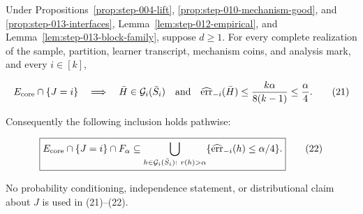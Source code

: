 \begin{proposition}\label{prop:step-013-pathwise}
Under Propositions~\ref{prop:step-004-lift},
\ref{prop:step-010-mechanism-good}, and
\ref{prop:step-013-interfaces}, Lemma~\ref{lem:step-012-empirical}, and
Lemma~\ref{lem:step-013-block-family}, suppose \(d\geq1\). For every
complete realization of the sample, partition, learner transcript,
mechanism coins, and analysis mark, and every \(i\in[k]\),

\[
 E_{\rm core}\cap\{J=i\}
 \quad\Longrightarrow\quad
 \bar H\in\mathcal G_i(\bar S_i)
 \quad\text{and}\quad
 \widehat{\operatorname{err}}_{-i}(\bar H)
 \leq\frac{k\alpha}{8(k-1)}\leq\frac\alpha4.
 \tag{21}
\]

Consequently the following inclusion holds pathwise:

\[
 \boxed{
 E_{\rm core}\cap\{J=i\}\cap F_\alpha
 \subseteq
 \bigcup_{h\in\mathcal G_i(\bar S_i):\ r(h)>\alpha}
 \{\widehat{\operatorname{err}}_{-i}(h)\leq\alpha/4\}.
 }
 \tag{22}
\]

No probability conditioning, independence statement, or distributional
claim about \(J\) is used in (21)--(22).


\end{proposition}

